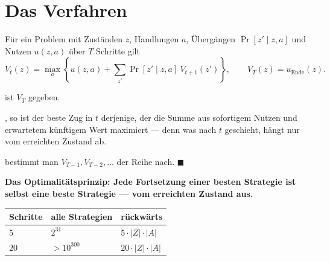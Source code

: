\section{Das Verfahren}

\begin{merksatz}
Für ein Problem mit Zuständen $z$, Handlungen $a$, Übergängen $\Pr[z' \mid z,a]$ und Nutzen $u(z,a)$ über $T$ Schritte gilt
\[ V_t(z) = \max_a \left\{ u(z,a) + \sum_{z'} \Pr[z'\mid z,a]\ V_{t+1}(z') \right\}, \qquad V_T(z) = u_{\text{Ende}}(z) . \]

 ist $V_T$ gegeben.

, so ist der beste Zug in $t$ derjenige, der die Summe aus sofortigem Nutzen und erwartetem künftigem Wert maximiert --- denn was nach $t$ geschieht, hängt nur vom erreichten Zustand ab.

 bestimmt man $V_{T-1}, V_{T-2}, \ldots$ der Reihe nach. $\blacksquare$

\begin{center}
\begin{minipage}{0.9\textwidth}
\textbf{Das Optimalitätsprinzip: Jede Fortsetzung einer besten Strategie ist selbst eine beste Strategie --- vom erreichten Zustand aus.}
\end{minipage}
\end{center}

\begin{center}
{\small
\renewcommand{\arraystretch}{1.48}
\begin{tabular}{@{}P{2.6cm}P{2.6cm}P{2.6cm}@{}}
\toprule
\textbf{Schritte} & \textbf{alle Strategien} & \textbf{rückwärts}\\
\midrule
$5$ & $2^{31}$ & $5\cdot|Z|\cdot|A|$\\
$20$ & $> 10^{300}$ & $20\cdot|Z|\cdot|A|$\\
\bottomrule
\end{tabular}}
\end{center}

\begin{center}
\begin{minipage}{0.88\textwidth}
\end{minipage}
\end{center}
\end{merksatz}

